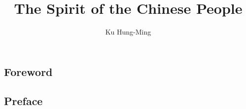 \documentclass{cplslarge}%
\newcommand{\doctitle}{The Spirit of the Chinese People}
\newcommand{\docauthor}{Ku Hung-Ming} %
\newcommand{\docsubject}{}
\newcommand{\doctitle}{春秋大義}
\newcommand{\docauthor}{辜鴻銘}
\newcommand{\docsubject}{中國人的精神}
\begin{document}
\frontmatter

  \title[\docsubject]{\doctitle}
  \author{\docauthor}

  \maketitle
  \tableofcontents
  \listoffigures
  \listoftables
  \editedlistofcontributors
  \printphotogallery


  \begin{foreword}
    \chapter*{Foreword}
    
  \end{foreword}

  \begin{foreword}
    \chapter*{Preface}
    
  \end{foreword}

\mainmatter
    
    
    
    
    
    
    
    

\backmatter
  \appendix
    
    
    
  \endappendix

\label{refs}

 \printindex
\end{document}
